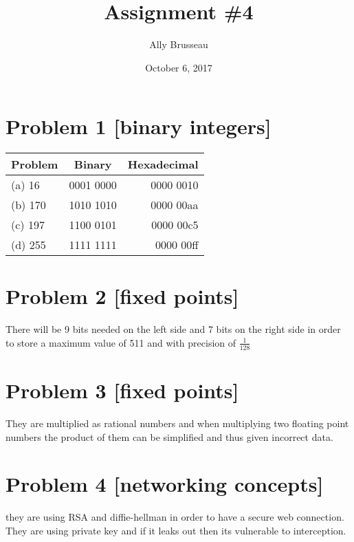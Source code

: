 \documentclass{article}
\title{Assignment \#4}
\author{Ally Brusseau}
\date{October 6, 2017}
\begin{document}
\maketitle

\section*{Problem 1 [binary integers]}

\begin{tabular}{|l | c | r|}
\hline
Problem & Binary & Hexadecimal \\ \hline
(a) 16 & 0001 0000 & 0000 0010 \\
(b) 170 & 1010 1010 & 0000 00aa \\
(c) 197 & 1100 0101 & 0000 00c5 \\
(d) 255 & 1111 1111 & 0000 00ff \\
\hline
\end{tabular}

\section*{Problem 2 [fixed points]}

There will be 9 bits needed on the left side and 7 bits on the right side in order to store a maximum value of 511 and with precision of $\frac{1}{128}$

\section*{Problem 3 [fixed points]}

They are multiplied as rational numbers and when multiplying two floating point numbers the product of them can be simplified and thus given incorrect data.

\section*{Problem 4 [networking concepts]}

they are using RSA and diffie-hellman in order to have a secure web connection. They are using private key and if it leaks out then its vulnerable to interception.
\end{document}
